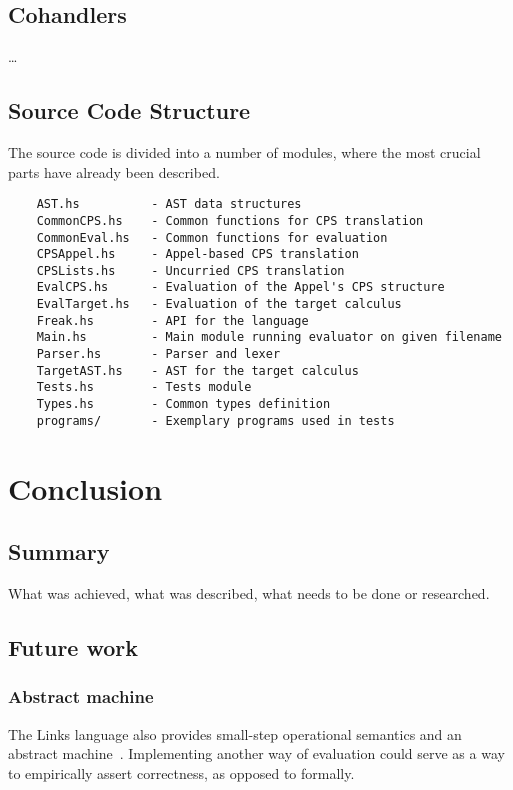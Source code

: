 \documentclass[declaration,shortabstract]{iithesis}
\theoremstyle{definition} \newtheorem{definition}{Definition}[chapter]
\theoremstyle{remark} \newtheorem{remark}[definition]{Observation}
\theoremstyle{plain} \newtheorem{theorem}[definition]{Theorem}
\theoremstyle{plain} \newtheorem{lemma}[definition]{Lemma}
\begin{document}
    \section{Cohandlers}
    \ldots

    \section{Source Code Structure}

    The source code is divided into a number of modules, where the most
    crucial parts have already been described.

    \begin{verbatim}
    AST.hs          - AST data structures
    CommonCPS.hs    - Common functions for CPS translation
    CommonEval.hs   - Common functions for evaluation
    CPSAppel.hs     - Appel-based CPS translation
    CPSLists.hs     - Uncurried CPS translation
    EvalCPS.hs      - Evaluation of the Appel's CPS structure
    EvalTarget.hs   - Evaluation of the target calculus
    Freak.hs        - API for the language
    Main.hs         - Main module running evaluator on given filename
    Parser.hs       - Parser and lexer
    TargetAST.hs    - AST for the target calculus
    Tests.hs        - Tests module
    Types.hs        - Common types definition
    programs/       - Exemplary programs used in tests
    \end{verbatim}

\chapter{Conclusion}
\section{Summary}

    What was achieved, what was described, what needs to be done or researched.

\section{Future work}

    \subsection{Abstract machine}

    The Links language also provides small-step operational semantics and
    an abstract machine~\cite{liberating-effects}. Implementing another way
    of evaluation could serve as a way to empirically assert correctness,
    as opposed to formally.
\end{document}
